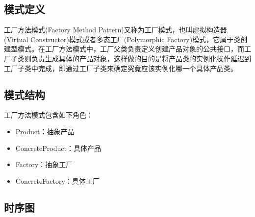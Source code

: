 \documentclass[letterpaper,10pt,english]{sphinxmanual}
\begin{document}
\subsection{模式定义}
\label{\detokenize{creational_patterns/factory_method:id3}}
\sphinxAtStartPar
工厂方法模式(Factory Method Pattern)又称为工厂模式，也叫虚拟构造器(Virtual Constructor)模式或者多态工厂(Polymorphic Factory)模式，它属于类创建型模式。在工厂方法模式中，工厂父类负责定义创建产品对象的公共接口，而工厂子类则负责生成具体的产品对象，这样做的目的是将产品类的实例化操作延迟到工厂子类中完成，即通过工厂子类来确定究竟应该实例化哪一个具体产品类。


\subsection{模式结构}
\label{\detokenize{creational_patterns/factory_method:id4}}
\sphinxAtStartPar
工厂方法模式包含如下角色：
\begin{itemize}
\item {} 
\sphinxAtStartPar
Product：抽象产品

\item {} 
\sphinxAtStartPar
ConcreteProduct：具体产品

\item {} 
\sphinxAtStartPar
Factory：抽象工厂

\item {} 
\sphinxAtStartPar
ConcreteFactory：具体工厂

\end{itemize}

\noindent{}


\subsection{时序图}
\label{\detokenize{creational_patterns/factory_method:id5}}
\noindent{}
\end{document}
